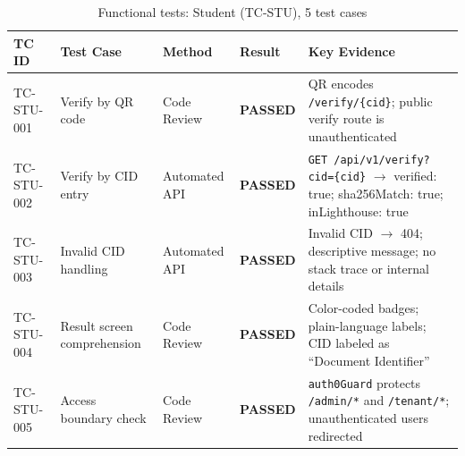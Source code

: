 \begin{table}[H]
  \centering
  \smalltable
  \footnotesize
  {%
  \setlength{\tabcolsep}{4pt}
  \renewcommand{\arraystretch}{1.3}
  \begin{tabular}{|>{\raggedright\arraybackslash}p{}|
                  >{\raggedright\arraybackslash}p{}|
                  >{\raggedright\arraybackslash}p{}|
                  >{\centering\arraybackslash}p{}|
                  >{\raggedright\arraybackslash}p{}|}
    \hline
    \textbf{TC ID} & \textbf{Test Case} & \textbf{Method} & \textbf{Result} & \textbf{Key Evidence} \\
    \hline\hline
    TC-STU-001 & Verify by QR code & Code Review & \textbf{PASSED} & QR encodes \texttt{/verify/\{cid\}}; public verify route is unauthenticated \\
    \hline
    TC-STU-002 & Verify by CID entry & Automated API & \textbf{PASSED} & \texttt{GET /api/v1/verify?cid=\{cid\}} $\rightarrow$ verified: true; sha256Match: true; inLighthouse: true \\
    \hline
    TC-STU-003 & Invalid CID handling & Automated API & \textbf{PASSED} & Invalid CID $\rightarrow$ 404; descriptive message; no stack trace or internal details \\
    \hline
    TC-STU-004 & Result screen comprehension & Code Review & \textbf{PASSED} & Color-coded badges; plain-language labels; CID labeled as ``Document Identifier'' \\
    \hline
    TC-STU-005 & Access boundary check & Code Review & \textbf{PASSED} & \texttt{auth0Guard} protects \texttt{/admin/*} and \texttt{/tenant/*}; unauthenticated users redirected \\
    \hline
  \end{tabular}
  }%
  \captionsetup{type=table}
  \caption{Functional tests: Student (TC-STU), 5 test cases}
  \label{tab:func-stu}
\end{table}

